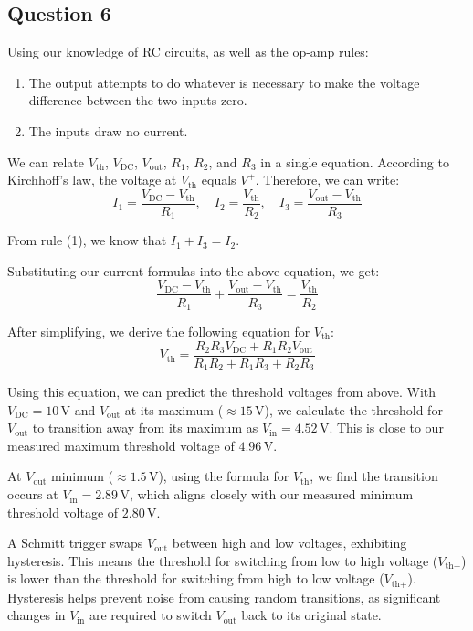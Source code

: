 \documentclass{article}
\begin{document}
\subsection*{Question 6}

Using our knowledge of RC circuits, as well as the op-amp rules:
\begin{enumerate}
    \item The output attempts to do whatever is necessary to make the voltage difference between the two inputs zero.
    \item The inputs draw no current.
\end{enumerate}

We can relate \( V_{\text{th}} \), \( V_{\text{DC}} \), \( V_{\text{out}} \), \( R_1 \), \( R_2 \), and \( R_3 \) in a single equation. According to Kirchhoff's law, the voltage at \( V_{\text{th}} \) equals \( V^+ \). Therefore, we can write:
\[
I_1 = \frac{V_{\text{DC}} - V_{\text{th}}}{R_1}, \quad I_2 = \frac{V_{\text{th}}}{R_2}, \quad I_3 = \frac{V_{\text{out}} - V_{\text{th}}}{R_3}
\]

From rule (1), we know that \( I_1 + I_3 = I_2 \).

Substituting our current formulas into the above equation, we get:
\[
\frac{V_{\text{DC}} - V_{\text{th}}}{R_1} + \frac{V_{\text{out}} - V_{\text{th}}}{R_3} = \frac{V_{\text{th}}}{R_2}
\]

After simplifying, we derive the following equation for \( V_{\text{th}} \):
\[
V_{\text{th}} = \frac{R_2 R_3 V_{\text{DC}} + R_1 R_2 V_{\text{out}}}{R_1 R_2 + R_1 R_3 + R_2 R_3}
\]

Using this equation, we can predict the threshold voltages from above. With \( V_{\text{DC}} = 10\,\text{V} \) and \( V_{\text{out}} \) at its maximum (\( \approx 15\,\text{V} \)), we calculate the threshold for \( V_{\text{out}} \) to transition away from its maximum as \( V_{\text{in}} = 4.52\,\text{V} \). This is close to our measured maximum threshold voltage of \( 4.96\,\text{V} \).

At \( V_{\text{out}} \) minimum (\( \approx 1.5\,\text{V} \)), using the formula for \( V_{\text{th}} \), we find the transition occurs at \( V_{\text{in}} = 2.89\,\text{V} \), which aligns closely with our measured minimum threshold voltage of \( 2.80\,\text{V} \).

A Schmitt trigger swaps \( V_{\text{out}} \) between high and low voltages, exhibiting hysteresis. This means the threshold for switching from low to high voltage (\( V_{\text{th}-} \)) is lower than the threshold for switching from high to low voltage (\( V_{\text{th}+} \)). Hysteresis helps prevent noise from causing random transitions, as significant changes in \( V_{\text{in}} \) are required to switch \( V_{\text{out}} \) back to its original state.
\end{document}
